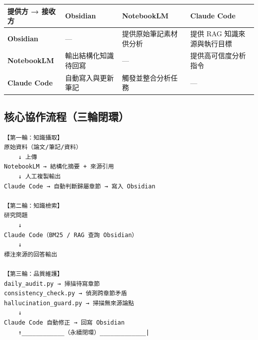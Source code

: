 {\def\LTcaptype{none} %
\begin{longtable}[]{@{}
  >{\raggedright\arraybackslash}p{}
  >{\raggedright\arraybackslash}p{}
  >{\raggedright\arraybackslash}p{}
  >{\raggedright\arraybackslash}p{}@{}}
\toprule\noalign{}
\begin{minipage}[b]{\linewidth}\raggedright
提供方 → 接收方
\end{minipage} & \begin{minipage}[b]{\linewidth}\raggedright
Obsidian
\end{minipage} & \begin{minipage}[b]{\linewidth}\raggedright
NotebookLM
\end{minipage} & \begin{minipage}[b]{\linewidth}\raggedright
Claude Code
\end{minipage} \\
\midrule\noalign{}
\endhead
\bottomrule\noalign{}
\endlastfoot
\textbf{Obsidian} & --- & 提供原始筆記素材供分析 & 提供 RAG
知識來源與執行目標 \\
\textbf{NotebookLM} & 輸出結構化知識待回寫 & --- &
提供高可信度分析指令 \\
\textbf{Claude Code} & 自動寫入與更新筆記 & 觸發並整合分析任務 & --- \\
\end{longtable}
}

\subsection{核心協作流程（三輪閉環）}\label{ux6838ux5fc3ux5354ux4f5cux6d41ux7a0bux4e09ux8f2aux9589ux74b0}

\begin{verbatim}
【第一輪：知識攝取】
原始資料（論文/筆記/資料）
    ↓ 上傳
NotebookLM → 結構化摘要 + 來源引用
    ↓ 人工複製輸出
Claude Code → 自動判斷歸屬章節 → 寫入 Obsidian

【第二輪：知識檢索】
研究問題
    ↓
Claude Code（BM25 / RAG 查詢 Obsidian）
    ↓
標注來源的回答輸出

【第三輪：品質維護】
daily_audit.py → 掃描待寫章節
consistency_check.py → 偵測跨章節矛盾
hallucination_guard.py → 掃描無來源論點
    ↓
Claude Code 自動修正 → 回寫 Obsidian
    ↑____________（永續閉環）_____________|
\end{verbatim}

